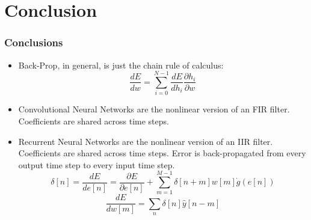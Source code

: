 \documentclass{beamer}
\begin{document}
\section{Conclusion}
\setcounter{subsection}{1}

\begin{frame}
  \frametitle{Conclusions}
  \begin{itemize}
  \item Back-Prop, in general, is just the chain rule of calculus:
    \begin{displaymath}
      \frac{dE}{dw} = \sum_{i=0}^{N-1}\frac{dE}{dh_i}\frac{\partial h_i}{\partial w}
    \end{displaymath}
  \item Convolutional Neural Networks are the nonlinear version of an FIR filter.
    Coefficients are shared across time steps.
  \item Recurrent Neural Networks are the nonlinear version of an IIR filter.  
    Coefficients are shared across time steps.
    Error is back-propagated from every output time step to every input time step.
    \begin{displaymath}
      \delta[n]=\frac{dE}{de[n]}=\frac{\partial E}{\partial e[n]}+
      \sum_{m=1}^{M-1}\delta[n+m]w[m]\dot{g}(e[n])
    \end{displaymath}
    \[
    \frac{dE}{dw[m]} = \sum_n \delta[n] \hat{y}[n-m]
    \]
  \end{itemize}
\end{frame}
\end{document}
